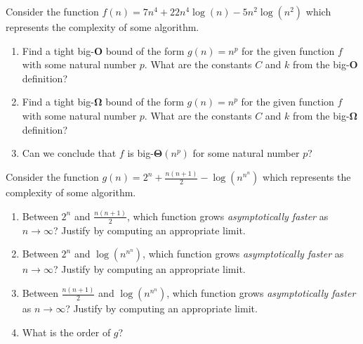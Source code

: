 \documentclass[11pt]{amsart}
\newcommand{\ds}{\displaystyle}
\newcommand{\be}{\begin{enumerate}}
\newcommand{\ee}{\end{enumerate}}
\begin{document}
\item Consider the function $f(n) = 7n^{4} + 22n^{4}\log{(n)} - 5n^{2}\log{(n^{2})}$ which represents the complexity of some algorithm. 

\be
	\item Find a tight big-\textbf{O} bound of the form $g(n) = n^{p}$ for the given function $f$ with some natural number $p$. What are the constants $C$ and $k$ from the big-\textbf{O} definition?
	\item Find a tight big-\textbf{$\boldsymbol{\Omega}$} bound of the form $g(n) = n^{p}$ for the given function $f$ with some natural number $p$. What are the constants $C$ and $k$ from the big-\textbf{$\boldsymbol{\Omega}$} definition?
	\item Can we conclude that $f$ is big-\textbf{$\boldsymbol{\Theta} (n^{p})$} for some natural number $p$?	
\ee
	\begin{sol}
\end{sol}

\item Consider the function $\ds g(n) = 2^n + \frac{n(n+1)}{2} -\log{\left( n^{n^n}\right) }$ which represents the complexity of some algorithm. 

\be
\item Between $2^n$ and $\frac{n(n+1)}{2}$, which function grows \textit{asymptotically faster} as $n \to \infty$?  Justify by computing an appropriate limit.
\item Between $2^n$ and $\log{\left( n^{n^n}\right) }$, which function grows \textit{asymptotically faster} as $n \to \infty$?  Justify by computing an appropriate limit.
\item Between $\frac{n(n+1)}{2}$ and $\log{\left( n^{n^n}\right) }$, which function grows \textit{asymptotically faster} as $n \to \infty$?  Justify by computing an appropriate limit.
\item What is the order of $g$?	
\ee
	\begin{sol}
\end{sol}

\clearpage
\end{document}
